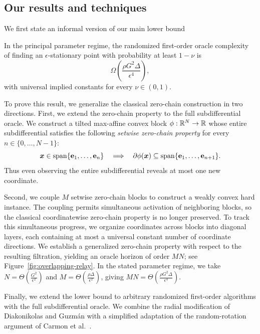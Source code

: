 \subsection{Our results and techniques} 
We first state an informal version of our main lower bound
\begin{theorem}[Informal]
In the principal parameter regime, the randomized first-order
oracle complexity of finding an \(\epsilon\)-stationary point
with probability at least \(1-\nu\) is
\[
\Omega\!\left(\frac{\rho G^2\Delta}{\epsilon^4}\right),
\]
with universal implied constants for every \(\nu\in(0,1)\).
\end{theorem}
To prove this result, we generalize the classical
zero-chain construction
\citep{nesterov2013introductory,CarmonEtAl2021}
in two directions.
First, we extend the zero-chain property to the full
subdifferential oracle. We construct a tilted max-affine
convex block $\phi:{\mathbb{R}}^N\to{\mathbb{R}}$ whose entire subdifferential
satisfies the following \emph{setwise zero-chain property} for every $n\in\{0,\ldots,N-1\}$: 
\[
 \bm{x}\in\operatorname{span}\{\mathbf e_1,\ldots,\mathbf e_n\}
 \quad\Longrightarrow\quad
 \partial \phi(\bm{x})\subseteq
 \operatorname{span}\{\mathbf e_1,\ldots,\mathbf e_{n+1}\}.
\]
Thus even observing the entire subdifferential reveals
at most one new coordinate. 

Second, we couple $M$ setwise zero-chain blocks
to construct a weakly convex hard instance.
The coupling permits simultaneous activation of
neighboring blocks, so the classical coordinatewise
zero-chain property is no longer preserved.
To track this simultaneous progress, we organize
coordinates across blocks into diagonal layers,
each containing at most a universal constant
number of coordinate directions.
We establish a generalized zero-chain property
with respect to the resulting filtration,
yielding an oracle horizon of order $MN$; see
Figure~\ref{fig:overlapping-relay}.
In the stated parameter regime, we take
$N=\Theta(\tfrac{G^2}{\epsilon^2})$ and
$M=\Theta(\tfrac{\rho\Delta}{\epsilon^2})$, giving
$MN=\Theta(\tfrac{\rho G^2\Delta}{\epsilon^4})$.


Finally, we extend the lower bound to arbitrary randomized
first-order algorithms with the full subdifferential oracle.
We combine the radial modification of Diakonikolas and
Guzm\'an \citep[Section~2.1]{DiakonikolasGuzman2020}
with a simplified adaptation of the random-rotation
argument of Carmon et al.\
\citep[Section~5.1]{carmon2020lower}.

